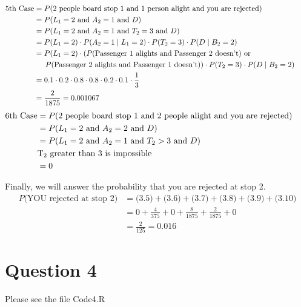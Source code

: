 \documentclass{article}
\numberwithin{equation}{section}
\newcommand{\eqname}[1]{\tag*{#1}}%
\begin{document}
\begin{align} 
	    \label{5th Case}
		\text{5th Case} &= P(\text{2 people board stop 1 and 1 person alight and you are rejected}) \eqname{} \\
		&= P(L\textsubscript{1} = 2 \text{ and } A\textsubscript{2} = 1 \text{ and } D) \eqname{} \\
		&= P(L_1 = 2 \text{ and } A_2 = 1 \text{ and } T_2 = 3 \text{ and } D)\eqname{} \\ 
    	&= P(L_1 = 2) \cdot P(A_2 = 1 \mid L_1 = 2) \cdot P(T_2 = 3) \cdot P(D \mid B_2=2) \eqname{} \\
    	&= P(L_1 = 2) \cdot (P\text{(Passenger 1 alights and Passenger 2 doesn't) or } \eqname{} \\
    	& \indent P\text{(Passenger 2 alights and Passenger 1 doesn't)}) \cdot P(T_2 = 3) \cdot P(D \mid B_2=2) \eqname{} \\
    	&= 0.1 \cdot 0.2 \cdot 0.8 \cdot 0.8 \cdot 0.2 \cdot 0.1 \cdot \frac{1}{3} \eqname{} \\
    	&= \frac{2}{1875} = 0.001067
\end{align}
\begin{align} 
	    \label{6th Case}
		\text{6th Case} &= P(\text{2 people board stop 1 and 2 people alight and you are rejected}) \eqname{} \\
		&= P(L\textsubscript{1} = 2 \text{ and } A\textsubscript{2} = 2 \text{ and } D) \eqname{} \\
		&= P(L_1 = 2 \text{ and } A_2 = 1 \text{ and } T_2 > 3 \text{ and } D)\eqname{} \\ 
		& \text{T\textsubscript{2} greater than 3 is impossible} \eqname{} \\
		&= 0
\end{align}


Finally, we will answer the probability that you are rejected at stop 2.
\begin{align} 
	    \label{Final Answer Problem 3b}            
	    P(\text{YOU rejected at stop 2)} &= \text{(3.5)} + \text{(3.6)} + \text{(3.7)} + \text{(3.8)} + \text{(3.9)} + \text{(3.10)} \eqname{} \\
            &= 0 + \frac{4}{375} + 0 + \frac{8}{1875} + \frac{2}{1875} + 0 \eqname{} \\
            &= \frac{2}{125} = 0.016
\end{align}

\section{Question 4}
Please see the file Code4.R
\end{document}
